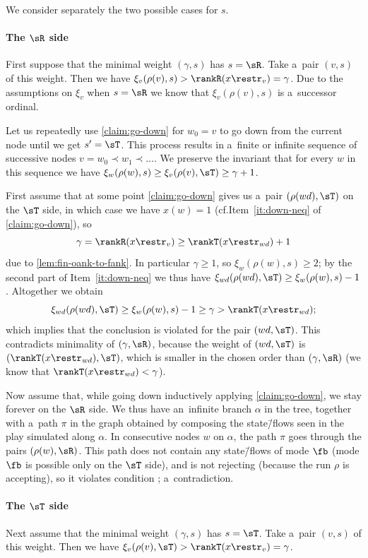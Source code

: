 We consider separately the two possible cases for $s$.


\paragraph*{The $\sR$ side}
	First suppose that the minimal weight $(\gamma, s)$ has $s=\sR$.
	Take a~pair $(v,s)$ of this weight.
	Then we have $\xi_v(\rho(v),s)>\rankR(x\restr_v)=\gamma$.
	Due to the assumptions on $\xi_v$ when $s=\sR$ we know that $\xi_v(\rho(v),s)$ is a~successor ordinal.
	
	Let us repeatedly use \cref{claim:go-down} for $w_0=v$ to go down from the current node until we get $s'=\sT$.
	This process results in a~finite or infinite sequence of successive nodes $v=w_0\prec w_1\prec \ldots$.
	We preserve the invariant that for every $w$ in this sequence we have $\xi_{w}(\rho(w),s)\geq\xi_v(\rho(v),\sT)\geq\gamma+1$.
	
	First assume that at some point \cref{claim:go-down} gives us a~pair $(\rho(wd),\sT)$ on the $\sT$ side, in which case we have $x(w)=1$ (cf.\@ Item~\ref{it:down-neq} of \cref{claim:go-down}), so
	\[\gamma=\rankR(x\restr_v)\geq\rankT(x\restr_{wd})+1\]
	due to \cref{lem:fin-oank-to-fank}.
	In particular $\gamma\geq 1$, so $\xi_{w}(\rho(w),s)\geq 2$; by the second part of Item~\ref{it:down-neq} we thus have $\xi_{wd}(\rho(wd),\sT)\geq\xi_{w}(\rho(w),s)-1$.
	Altogether we obtain
	\[\xi_{wd}(\rho(wd),\sT)\geq\xi_{w}(\rho(w),s)-1\geq\gamma>\rankT(x\restr_{wd});\]
	which implies that the conclusion is violated for the pair $(wd, \sT)$.
	This contradicts minimality of $(\gamma,\sR)$, because the weight of $(wd, \sT)$ is $(\rankT(x\restr_{wd}),\sT)$, which is smaller in the chosen order than $(\gamma,\sR)$ (we know that $\rankT(x\restr_{wd})< \gamma$).
	
	Now assume that, while going down inductively applying \cref{claim:go-down}, we stay forever on the $\sR$ side.
	We thus have an~infinite branch $\alpha$ in the tree, together with a~path $\pi$ in the graph obtained by composing the state\=/flows seen in the play simulated along $\alpha$.
	In consecutive nodes $w$ on $\alpha$, the path $\pi$ goes through the pairs $(\rho(w),\sR)$.
	This path does not contain any state\=/flows of mode $\fb$ (mode $\fb$ is possible only on the $\sT$ side),
	and is not rejecting (because the run $\rho$ is accepting), so it violates condition ; a~contradiction.
	

\paragraph*{The $\sT$ side}
	Next assume that the minimal weight $(\gamma, s)$ has $s=\sT$.
	Take a~pair $(v,s)$ of this weight.
	Then we have $\xi_v(\rho(v),\sT)>\rankT(x\restr_v)=\gamma$.
	
